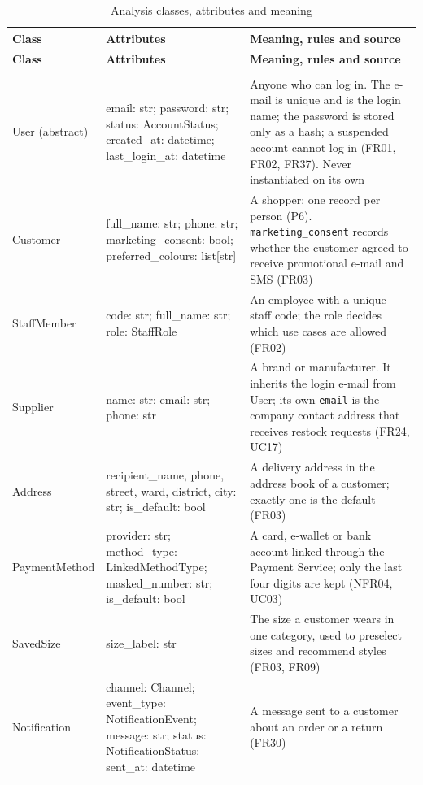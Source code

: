 {\small
\begin{xltabular}{\textwidth}{@{}L{3.0cm} L{4.8cm} Y@{}}
\caption{Analysis classes, attributes and meaning}\label{tab:classes}\\
\toprule
\textbf{Class} & \textbf{Attributes} & \textbf{Meaning, rules and source} \\ \midrule
\endfirsthead
\toprule
\textbf{Class} & \textbf{Attributes} & \textbf{Meaning, rules and source} \\ \midrule
\endhead
\bottomrule
\endlastfoot
{} \\
\textsf{User} (abstract) & email: str; password: str; status: AccountStatus; created\_at: datetime; last\_login\_at: datetime & Anyone who can log in. The e-mail is unique and is the login name; the password is stored only as a hash; a suspended account cannot log in (FR01, FR02, FR37). Never instantiated on its own \\
\textsf{Customer} & full\_name: str; phone: str; marketing\_consent: bool; preferred\_colours: list[str] & A shopper; one record per person (P6). \texttt{marketing\_consent} records whether the customer agreed to receive promotional e-mail and SMS (FR03) \\
\textsf{StaffMember} & code: str; full\_name: str; role: StaffRole & An employee with a unique staff code; the role decides which use cases are allowed (FR02) \\
\textsf{Supplier} & name: str; email: str; phone: str & A brand or manufacturer. It inherits the login e-mail from \textsf{User}; its own \texttt{email} is the company contact address that receives restock requests (FR24, UC17) \\
\textsf{Address} & recipient\_name, phone, street, ward, district, city: str; is\_default: bool & A delivery address in the address book of a customer; exactly one is the default (FR03) \\
\textsf{PaymentMethod} & provider: str; method\_type: LinkedMethodType; masked\_number: str; is\_default: bool & A card, e-wallet or bank account linked through the Payment Service; only the last four digits are kept (NFR04, UC03) \\
\textsf{SavedSize} & size\_label: str & The size a customer wears in one category, used to preselect sizes and recommend styles (FR03, FR09) \\
\textsf{Notification} & channel: Channel; event\_type: NotificationEvent; message: str; status: NotificationStatus; sent\_at: datetime & A message sent to a customer about an order or a return (FR30) \\

\end{xltabular}}
